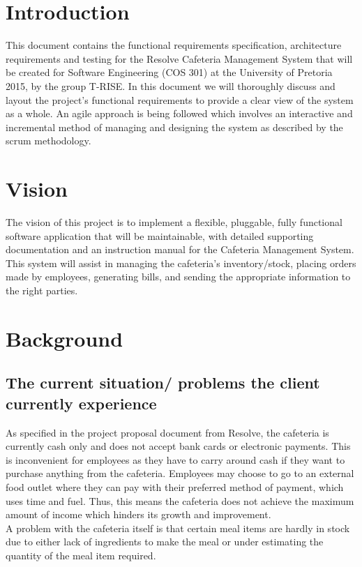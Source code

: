\documentclass[a4paper,12pt]{report}
\begin{document}
\pagebreak




\section{Introduction}
This document contains the functional requirements specification, architecture requirements and testing for the Resolve Cafeteria Management System that will be created for Software Engineering (COS 301) at the University of Pretoria 2015, by the group T-RISE. In this document we will thoroughly discuss and layout the project's functional requirements to provide a clear view of the system as a whole. An agile approach is being followed which involves an interactive and incremental method of managing and designing the system as described by the scrum methodology.
\section{Vision}
The vision of this project is to implement a flexible, pluggable, fully functional software application that will be maintainable, with detailed supporting documentation and an instruction manual for the Cafeteria Management System. This system will assist in managing the cafeteria's inventory/stock, placing orders made by employees, generating bills, and sending the appropriate information to the right parties.  

\section{Background} 
\subsection{The current situation/ problems the client currently experience}
As specified in the project proposal document from Resolve, the cafeteria is currently cash only and does not accept bank cards or electronic payments. This is inconvenient for employees as they have to carry around cash if they want to purchase anything from the cafeteria. Employees may choose to go to an external food outlet where they can pay with their preferred method of payment, which uses time and fuel. Thus, this means the cafeteria does not achieve the maximum amount of income which hinders its growth and improvement.\\ A problem with the cafeteria itself is that certain meal items are hardly in stock due to either lack of ingredients to make the meal or under estimating the quantity of the meal item required.
\end{document}
